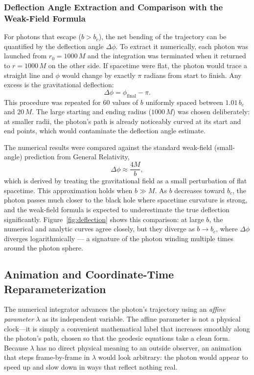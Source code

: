 \documentclass[12pt,a4paper]{article}
\begin{document}
\subsubsection{Deflection Angle Extraction and Comparison with the Weak-Field Formula}
For photons that escape ($b > b_c$), the net bending of the trajectory can be quantified by the deflection angle $\Delta\phi$. To extract it numerically, each photon was launched from
$r_0 = 1000\,M$ and the integration was terminated when it returned to $r = 1000\,M$ on the
other side. If spacetime were flat, the photon would trace a straight line and $\phi$ would
change by exactly $\pi$ radians from start to finish. Any excess is the gravitational deflection:
\begin{equation}
    \Delta\phi = \phi_\mathrm{final} - \pi.
    \label{eq:dphi_extract}
\end{equation}
This procedure was repeated for 60 values of $b$ uniformly spaced between $1.01\,b_c$ and $20\,M$. The large starting and ending radius ($1000\,M$) was chosen deliberately: at smaller radii, the photon's path is already noticeably curved at its start and end points, which would contaminate the deflection angle estimate.

The numerical results were compared against the standard weak-field (small-angle) prediction from General Relativity,
\begin{equation}
    \Delta\phi \approx \frac{4M}{b},
    \label{eq:wf}
\end{equation}
which is derived by treating the gravitational field as a small perturbation of flat spacetime.
This approximation holds when $b \gg M$. As $b$ decreases toward $b_c$, the photon passes much closer to the black hole where spacetime curvature is strong, and the weak-field formula is expected to underestimate the true deflection significantly. Figure~\ref{fig:deflection} shows this comparison: at large $b$, the numerical and analytic curves agree closely, but they diverge as $b \to b_c$, where $\Delta\phi$ diverges logarithmically --- a signature of the photon winding multiple times around the photon sphere.

\subsection{Animation and Coordinate-Time Reparameterization}

The numerical integrator advances the photon's trajectory using an \textit{affine parameter} $\lambda$ as its independent variable. The affine parameter is not a physical clock---it is simply a convenient mathematical label that increases smoothly along the photon's path, chosen so that the geodesic equations take a clean form. Because $\lambda$ has no direct physical meaning to an outside observer, an animation that steps frame-by-frame in  $\lambda$ would look arbitrary: the photon would appear to speed up and slow down in ways that reflect nothing real.
\end{document}
